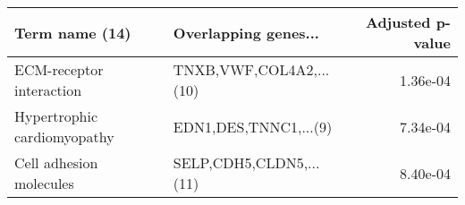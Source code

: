 \begin{tabular}{llr}
\toprule
             Term name (14) &    Overlapping genes... &  Adjusted p-value \\
\midrule
   ECM-receptor interaction & TNXB,VWF,COL4A2,...(10) &          1.36e-04 \\
Hypertrophic cardiomyopathy &   EDN1,DES,TNNC1,...(9) &          7.34e-04 \\
    Cell adhesion molecules & SELP,CDH5,CLDN5,...(11) &          8.40e-04 \\
\bottomrule
\end{tabular}
